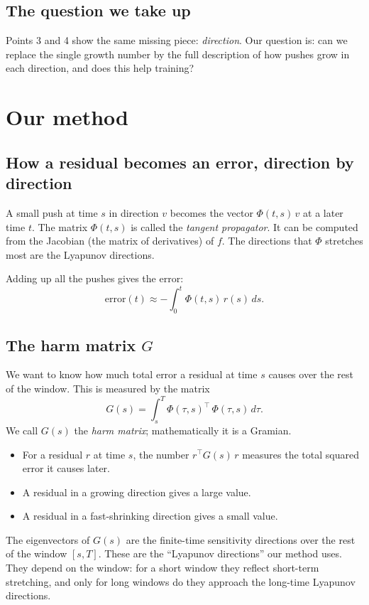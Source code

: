 \documentclass[11pt,a4paper]{article}
\begin{document}
\subsection{The question we take up}
Points 3 and 4 show the same missing piece: \emph{direction}. Our question is: can we
replace the single growth number by the full description of how pushes grow in each
direction, and does this help training?

\section{Our method}
\label{sec:method}

\subsection{How a residual becomes an error, direction by direction}
A small push at time $s$ in direction $v$ becomes the vector $\Phi(t,s)\,v$ at a later time
$t$. The matrix $\Phi(t,s)$ is called the \emph{tangent propagator}. It can be computed from
the Jacobian (the matrix of derivatives) of $f$. The directions that $\Phi$ stretches most
are the Lyapunov directions.

Adding up all the pushes gives the error:
\[
 \text{error}(t) \approx -\int_0^t \Phi(t,s)\,r(s)\,ds .
\]

\subsection{The harm matrix $G$}
We want to know how much total error a residual at time $s$ causes over the rest of the
window. This is measured by the matrix
\[
 G(s) = \int_s^T \Phi(\tau,s)^{\top}\,\Phi(\tau,s)\,d\tau .
\]
We call $G(s)$ the \emph{harm matrix}; mathematically it is a Gramian.
\begin{itemize}
\item For a residual $r$ at time $s$, the number $r^{\top}G(s)\,r$ measures the total
  squared error it causes later.
\item A residual in a growing direction gives a large value.
\item A residual in a fast-shrinking direction gives a small value.
\end{itemize}
The eigenvectors of $G(s)$ are the finite-time sensitivity directions over the rest of the
window $[s,T]$. These are the ``Lyapunov directions'' our method uses. They depend on the
window: for a short window they reflect short-term stretching, and only for long windows
do they approach the long-time Lyapunov directions.
\end{document}
